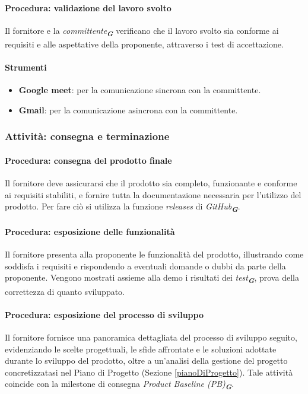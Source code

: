\documentclass[a4paper,12pt]{article}
\newcommand{\glossario}[1]{\textit{#1}\textsubscript{\textbf{\textit{\textcolor{lightblack}{G}}}}}
\begin{document}
\paragraph{Procedura: validazione del lavoro svolto}
Il fornitore e la \glossario{committente} verificano che il lavoro svolto sia conforme ai
requisiti e alle aspettative della proponente, attraverso i test di
accettazione.

\paragraph{Strumenti}
\begin{itemize}
    \item \textbf{Google meet}: per la comunicazione sincrona con la committente.
    \item \textbf{Gmail}: per la comunicazione asincrona con la committente.
\end{itemize}

\subsubsection{Attività: consegna e terminazione}
\paragraph{Procedura: consegna del prodotto finale}
Il fornitore deve assicurarsi che il prodotto sia completo, funzionante e
conforme ai requisiti stabiliti, e fornire tutta la documentazione necessaria
per l'utilizzo del prodotto. Per fare ciò si utilizza la funzione \textit{releases} di \glossario{GitHub}.

\paragraph{Procedura: esposizione delle funzionalità}
Il fornitore presenta alla proponente le funzionalità del prodotto, illustrando
come soddisfa i requisiti e rispondendo a eventuali domande o dubbi da parte
della proponente. Vengono mostrati assieme alla demo i risultati dei \glossario{test}, prova della
correttezza di quanto sviluppato.

\paragraph{Procedura: esposizione del processo di sviluppo}
Il fornitore fornisce una panoramica dettagliata del processo di sviluppo
seguito, evidenziando le scelte progettuali, le sfide affrontate e le soluzioni
adottate durante lo sviluppo del prodotto, oltre a un'analisi della gestione
del progetto concretizzatasi nel Piano di Progetto (Sezione
\ref{pianoDiProgetto}). Tale attività coincide con la milestone di consegna
\glossario{Product Baseline (PB)}.
\end{document}
